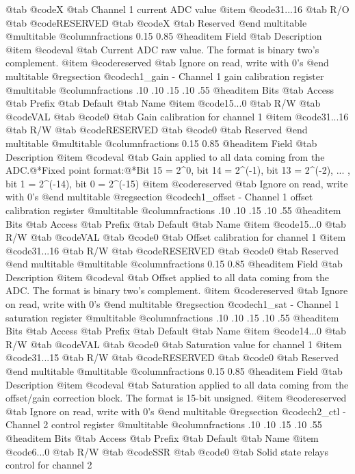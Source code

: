 @tab @code{X} @tab 
Channel 1 current ADC value
@item @code{31...16}
@tab R/O @tab
@code{RESERVED}
@tab @code{X} @tab 
Reserved
@end multitable
@multitable @columnfractions 0.15 0.85
@headitem Field @tab Description
@item @code{val} @tab Current ADC raw value. The format is binary two's complement.
@item @code{reserved} @tab Ignore on read, write with 0's
@end multitable
@regsection @code{ch1_gain} - Channel 1 gain calibration register
@multitable @columnfractions .10 .10 .15 .10 .55
@headitem Bits @tab Access @tab Prefix @tab Default @tab Name
@item @code{15...0}
@tab R/W @tab
@code{VAL}
@tab @code{0} @tab 
Gain calibration for channel 1
@item @code{31...16}
@tab R/W @tab
@code{RESERVED}
@tab @code{0} @tab 
Reserved
@end multitable
@multitable @columnfractions 0.15 0.85
@headitem Field @tab Description
@item @code{val} @tab Gain applied to all data coming from the ADC.@*Fixed point format:@*Bit 15 = 2^0, bit 14 = 2^(-1), bit 13 = 2^(-2), ... , bit 1 = 2^(-14), bit 0 = 2^(-15)
@item @code{reserved} @tab Ignore on read, write with 0's
@end multitable
@regsection @code{ch1_offset} - Channel 1 offset calibration register
@multitable @columnfractions .10 .10 .15 .10 .55
@headitem Bits @tab Access @tab Prefix @tab Default @tab Name
@item @code{15...0}
@tab R/W @tab
@code{VAL}
@tab @code{0} @tab 
Offset calibration for channel 1
@item @code{31...16}
@tab R/W @tab
@code{RESERVED}
@tab @code{0} @tab 
Reserved
@end multitable
@multitable @columnfractions 0.15 0.85
@headitem Field @tab Description
@item @code{val} @tab Offset applied to all data coming from the ADC. The format is binary two's complement.
@item @code{reserved} @tab Ignore on read, write with 0's
@end multitable
@regsection @code{ch1_sat} - Channel 1 saturation register
@multitable @columnfractions .10 .10 .15 .10 .55
@headitem Bits @tab Access @tab Prefix @tab Default @tab Name
@item @code{14...0}
@tab R/W @tab
@code{VAL}
@tab @code{0} @tab 
Saturation value for channel 1
@item @code{31...15}
@tab R/W @tab
@code{RESERVED}
@tab @code{0} @tab 
Reserved
@end multitable
@multitable @columnfractions 0.15 0.85
@headitem Field @tab Description
@item @code{val} @tab Saturation applied to all data coming from the offset/gain correction block. The format is 15-bit unsigned.
@item @code{reserved} @tab Ignore on read, write with 0's
@end multitable
@regsection @code{ch2_ctl} - Channel 2 control register
@multitable @columnfractions .10 .10 .15 .10 .55
@headitem Bits @tab Access @tab Prefix @tab Default @tab Name
@item @code{6...0}
@tab R/W @tab
@code{SSR}
@tab @code{0} @tab 
Solid state relays control for channel 2
